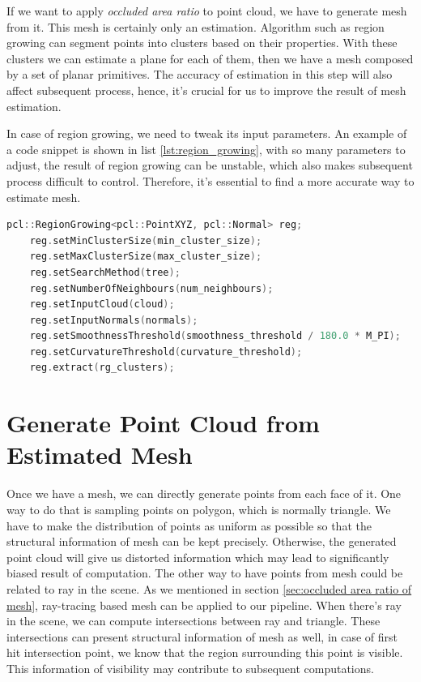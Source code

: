 \documentclass[11pt, a4paper,oneside,chapterprefix=false]{scrbook}
\begin{document}
If we want to apply \emph{occluded area ratio} to point cloud, we have to generate mesh from it. This mesh is certainly only an estimation. Algorithm such as region growing can segment points into clusters based on their properties. With these clusters we can estimate a plane for each of them, then we have a mesh composed by a set of planar primitives. The accuracy of estimation in this step will also affect subsequent process, hence, it's crucial for us to improve the result of mesh estimation. 

\vspace{10pt}

In case of region growing, we need to tweak its input parameters. An example of a code snippet is shown in list \ref{lst:region_growing}, with so many parameters to adjust, the result of region growing can be unstable, which also makes subsequent process difficult to control. Therefore, it's essential to find a more accurate way to estimate mesh.   
\begin{lstlisting}[language=C++, caption=region growing, label=lst:region_growing]
    pcl::RegionGrowing<pcl::PointXYZ, pcl::Normal> reg;
    reg.setMinClusterSize(min_cluster_size);
    reg.setMaxClusterSize(max_cluster_size);
    reg.setSearchMethod(tree);
    reg.setNumberOfNeighbours(num_neighbours);
    reg.setInputCloud(cloud);
    reg.setInputNormals(normals);
    reg.setSmoothnessThreshold(smoothness_threshold / 180.0 * M_PI);
    reg.setCurvatureThreshold(curvature_threshold);
    reg.extract(rg_clusters);
\end{lstlisting}

\section{Generate Point Cloud from Estimated Mesh} \label{generate point cloud from estimated mesh}

Once we have a mesh, we can directly generate points from each face of it. One way to do that is sampling points on polygon, which is normally triangle. We have to make the distribution of points as uniform as possible so that the structural information of mesh can be kept precisely. Otherwise, the generated point cloud will give us distorted information which may lead to significantly biased result of computation. The other way to have points from mesh could be related to ray in the scene. As we mentioned in section \ref{sec:occluded area ratio of mesh}, ray-tracing based mesh can be applied to our pipeline. When there's ray in the scene, we can compute intersections between ray and triangle. These intersections can present structural information of mesh as well, in case of first hit intersection point, we know that the region surrounding this point is visible. This information of visibility may contribute to subsequent computations. 
\end{document}
